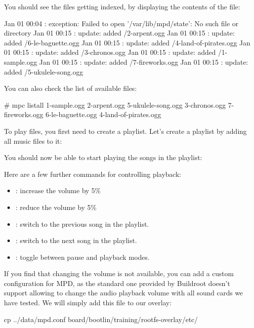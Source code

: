 
You should see the files getting indexed, by displaying the contents
of the  file:

\begin{terminaloutput}
Jan 01 00:04 : exception: Failed to open '/var/lib/mpd/state': No such file or directory
Jan 01 00:15 : update: added /2-arpent.ogg
Jan 01 00:15 : update: added /6-le-baguette.ogg
Jan 01 00:15 : update: added /4-land-of-pirates.ogg
Jan 01 00:15 : update: added /3-chronos.ogg
Jan 01 00:15 : update: added /1-sample.ogg
Jan 01 00:15 : update: added /7-fireworks.ogg
Jan 01 00:15 : update: added /5-ukulele-song.ogg
\end{terminaloutput}

You can also check the list of available files:
\begin{terminaloutput}
# mpc listall
1-sample.ogg
2-arpent.ogg
5-ukulele-song.ogg
3-chronos.ogg
7-fireworks.ogg
6-le-baguette.ogg
4-land-of-pirates.ogg
\end{terminaloutput}

To play files, you first need to create a playlist. Let's create a
playlist by adding all music files to it:


You should now be able to start playing the songs in the playlist:


Here are a few further commands for controlling playback:
\begin{itemize}
\item {}: increase the volume by 5\%
\item {}: reduce the volume by 5\%
\item {}: switch to the previous song in the playlist.
\item {}: switch to the next song in the playlist.
\item {}: toggle between pause and playback modes.
\end{itemize}

If you find that changing the volume is not available, you can
add a custom configuration for MPD, as the standard one
provided by Buildroot doesn't support allowing to change the audio
playback volume with all sound cards we have tested. We will simply
add this file to our overlay:

\begin{bashinput}
cp ../data/mpd.conf board/bootlin/training/rootfs-overlay/etc/
\end{bashinput}

